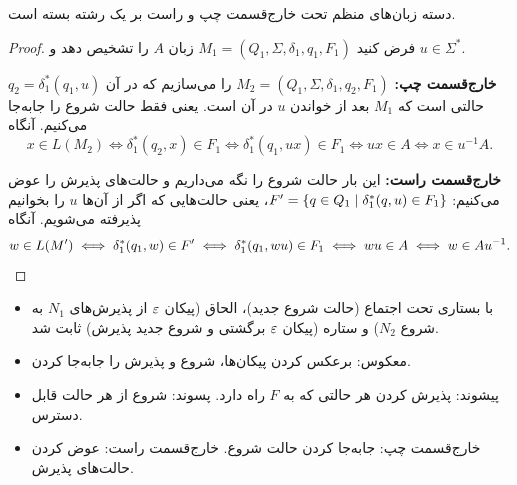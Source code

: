 \begin{theorem}
دسته زبان‌های منظم تحت خارج‌قسمت چپ و راست بر یک رشته بسته است.
\end{theorem}
\begin{proof}
فرض کنید  $M_1=(Q_1,\Sigma,\delta_1,q_1,F_1)$ زبان $A$ را تشخیص دهد و $u\in\Sigma^*$.

\textbf{خارج‌قسمت چپ:} $M_2=(Q_1,\Sigma,\delta_1,q_2,F_1)$ را می‌سازیم که در آن $q_2=\delta_1^*(q_1,u)$ حالتی است که $M_1$ بعد از خواندن $u$ در آن است. یعنی فقط حالت شروع را جابه‌جا می‌کنیم. آنگاه
\[x\in L(M_2)\iff \delta_1^*(q_2,x)\in F_1\iff\delta_1^*(q_1,ux)\in F_1\iff ux\in A\iff x\in u^{-1}A.\]

\textbf{خارج‌قسمت راست:} این بار حالت شروع را نگه می‌داریم و حالت‌های پذیرش را عوض می‌کنیم: $F'=\{q\in Q_1\st \delta_1^*(q,u)\in F_1\}$، یعنی حالت‌هایی که اگر از آن‌ها $u$ را بخوانیم پذیرفته می‌شویم. آنگاه
\[w\in L(M')\iff\delta_1^*(q_1,w)\in F'\iff\delta_1^*(q_1,wu)\in F_1\iff wu\in A\iff w\in Au^{-1}.\qedhere\]
\end{proof}

\begin{summary}
\begin{itemize}
\item با  بستاری تحت اجتماع (حالت شروع جدید)، الحاق (پیکان $\eps$ از پذیرش‌های $N_1$ به شروع $N_2$) و ستاره (پیکان $\eps$ برگشتی و شروع جدید پذیرش) ثابت شد.
\item معکوس: برعکس کردن پیکان‌ها، شروع و پذیرش را جابه‌جا کردن.
\item پیشوند: پذیرش کردن هر حالتی که به $F$ راه دارد. پسوند: شروع از هر حالت قابل دسترس.
\item خارج‌قسمت چپ: جابه‌جا کردن حالت شروع. خارج‌قسمت راست: عوض کردن حالت‌های پذیرش.
\end{itemize}
\end{summary}
